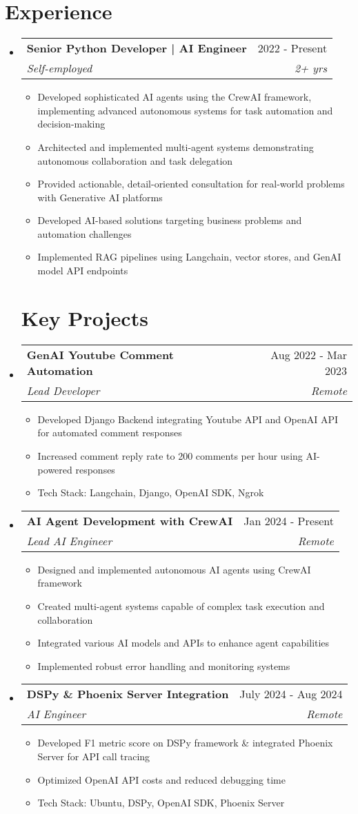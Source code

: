 \documentclass[11pt,a4paper]{article}
\makeatletter
\newcommand{\resumeItem}[1]{\item #1}
\newcommand{\resumeSubheading}[4]{
  \vspace{-2pt}\item
    \begin{tabular*}{0.97\textwidth}[t]{l@{\extracolsep{\fill}}r}
      \textbf{#1} & #2 \\
      \textit{\small#3} & \textit{\small #4} \\
    \end{tabular*}\vspace{-7pt}
}
\makeatother
\begin{document}
\section{Experience}
\begin{itemize}[leftmargin=*]
    \resumeSubheading
      {Senior Python Developer | AI Engineer}{2022 - Present}
      {Self-employed}{2+ yrs}
      \begin{itemize}[leftmargin=*]
        \resumeItem{Developed sophisticated AI agents using the CrewAI framework, implementing advanced autonomous systems for task automation and decision-making}
        \resumeItem{Architected and implemented multi-agent systems demonstrating autonomous collaboration and task delegation}
        \resumeItem{Provided actionable, detail-oriented consultation for real-world problems with Generative AI platforms}
        \resumeItem{Developed AI-based solutions targeting business problems and automation challenges}
        \resumeItem{Implemented RAG pipelines using Langchain, vector stores, and GenAI model API endpoints}
      \end{itemize}

\section{Key Projects}
    \resumeSubheading
      {GenAI Youtube Comment Automation}{Aug 2022 - Mar 2023}
      {Lead Developer}{Remote}
      \begin{itemize}[leftmargin=*]
        \resumeItem{Developed Django Backend integrating Youtube API and OpenAI API for automated comment responses}
        \resumeItem{Increased comment reply rate to 200 comments per hour using AI-powered responses}
        \resumeItem{Tech Stack: Langchain, Django, OpenAI SDK, Ngrok}
      \end{itemize}
      
    \resumeSubheading
      {AI Agent Development with CrewAI}{Jan 2024 - Present}
      {Lead AI Engineer}{Remote}
      \begin{itemize}[leftmargin=*]
        \resumeItem{Designed and implemented autonomous AI agents using CrewAI framework}
        \resumeItem{Created multi-agent systems capable of complex task execution and collaboration}
        \resumeItem{Integrated various AI models and APIs to enhance agent capabilities}
        \resumeItem{Implemented robust error handling and monitoring systems}
      \end{itemize}

    \resumeSubheading
      {DSPy \& Phoenix Server Integration}{July 2024 - Aug 2024}
      {AI Engineer}{Remote}
      \begin{itemize}[leftmargin=*]
        \resumeItem{Developed F1 metric score on DSPy framework \& integrated Phoenix Server for API call tracing}
        \resumeItem{Optimized OpenAI API costs and reduced debugging time}
        \resumeItem{Tech Stack: Ubuntu, DSPy, OpenAI SDK, Phoenix Server}
      \end{itemize}
\end{itemize}
\end{document}
